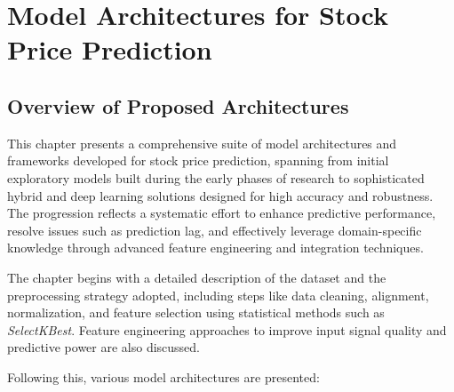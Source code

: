 \chapter{Model Architectures for Stock Price Prediction}

\section{Overview of Proposed Architectures}

This chapter presents a comprehensive suite of model architectures and frameworks developed for stock price prediction, spanning from initial exploratory models built during the early phases of research to sophisticated hybrid and deep learning solutions designed for high accuracy and robustness. The progression reflects a systematic effort to enhance predictive performance, resolve issues such as prediction lag, and effectively leverage domain-specific knowledge through advanced feature engineering and integration techniques.

The chapter begins with a detailed description of the dataset and the preprocessing strategy adopted, including steps like data cleaning, alignment, normalization, and feature selection using statistical methods such as \textit{SelectKBest}. Feature engineering approaches to improve input signal quality and predictive power are also discussed.

Following this, various model architectures are presented:

